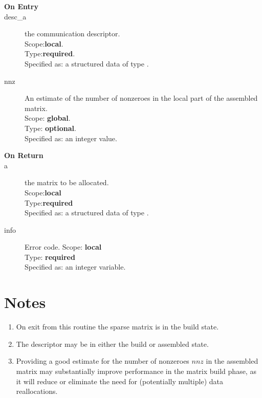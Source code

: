 


%
%


\begin{description}
\item[\bf On Entry]
\item[desc\_a] the communication descriptor.\\
Scope:{\bf local}.\\
Type:{\bf required}.\\
Specified as: a structured data of type \descdata.
\item[nnz] An estimate of the number of nonzeroes in the local
  part of the assembled matrix.\\ 
Scope: {\bf global}.\\
Type: {\bf optional}.\\
Specified as: an integer value. 
\end{description}

\begin{description}
\item[\bf On Return]
\item[a] the matrix to be allocated.\\
Scope:{\bf local}\\
Type:{\bf required}\\
Specified as: a structured data of type \spdata.
\item[info] Error code.
Scope: {\bf local} \\
Type: {\bf required}\\
Specified as: an integer variable.
\end{description}
\section*{Notes}
\begin{enumerate}
\item On exit from this routine the sparse matrix  is in the build
  state.
\item The descriptor may be in either the build or assembled state.
\item Providing a good estimate for the number of nonzeroes $nnz$ in
  the assembled matrix may substantially improve performance in the
  matrix build phase, as it will reduce or eliminate the need for
  (potentially multiple) data reallocations. 
\end{enumerate}



